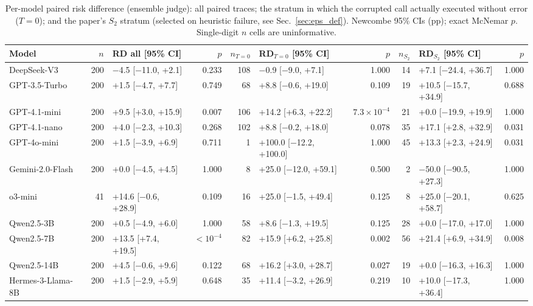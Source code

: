 \begin{table}[t]
\centering
\small
\caption{Per-model paired risk difference (ensemble judge): all paired traces; the stratum in which the corrupted call actually executed without error ($T{=}0$); and the paper's $S_2$ stratum (selected on heuristic failure, see Sec.~\ref{sec:eps_def}). Newcombe 95\% CIs (pp); exact McNemar $p$. Single-digit $n$ cells are uninformative.}
\label{tab:paired_rd_model}
\setlength{\tabcolsep}{3pt}
\begin{tabular}{l r l r r l r r l r}
\toprule
Model & $n$ & RD all [95\% CI] & $p$ & $n_{T=0}$ & RD$_{T=0}$ [95\% CI] & $p$ & $n_{S_2}$ & RD$_{S_2}$ [95\% CI] & $p$ \\
\midrule
DeepSeek-V3 & 200 & $-$4.5 [$-$11.0, +2.1] & 0.233 & 108 & $-$0.9 [$-$9.0, +7.1] & 1.000 & 14 & +7.1 [$-$24.4, +36.7] & 1.000 \\
GPT-3.5-Turbo & 200 & +1.5 [$-$4.7, +7.7] & 0.749 & 68 & +8.8 [$-$0.6, +19.0] & 0.109 & 19 & +10.5 [$-$15.7, +34.9] & 0.688 \\
GPT-4.1-mini & 200 & +9.5 [+3.0, +15.9] & 0.007 & 106 & +14.2 [+6.3, +22.2] & $7.3\times10^{-4}$ & 21 & +0.0 [$-$19.9, +19.9] & 1.000 \\
GPT-4.1-nano & 200 & +4.0 [$-$2.3, +10.3] & 0.268 & 102 & +8.8 [$-$0.2, +18.0] & 0.078 & 35 & +17.1 [+2.8, +32.9] & 0.031 \\
GPT-4o-mini & 200 & +1.5 [$-$3.9, +6.9] & 0.711 & 1 & +100.0 [$-$12.2, +100.0] & 1.000 & 45 & +13.3 [+2.3, +24.9] & 0.031 \\
Gemini-2.0-Flash & 200 & +0.0 [$-$4.5, +4.5] & 1.000 & 8 & +25.0 [$-$12.0, +59.1] & 0.500 & 2 & $-$50.0 [$-$90.5, +27.3] & 1.000 \\
o3-mini & 41 & +14.6 [$-$0.6, +28.9] & 0.109 & 16 & +25.0 [$-$1.5, +49.4] & 0.125 & 8 & +25.0 [$-$20.1, +58.7] & 0.625 \\
Qwen2.5-3B & 200 & +0.5 [$-$4.9, +6.0] & 1.000 & 58 & +8.6 [$-$1.3, +19.5] & 0.125 & 28 & +0.0 [$-$17.0, +17.0] & 1.000 \\
Qwen2.5-7B & 200 & +13.5 [+7.4, +19.5] & $<10^{-4}$ & 82 & +15.9 [+6.2, +25.8] & 0.002 & 56 & +21.4 [+6.9, +34.9] & 0.008 \\
Qwen2.5-14B & 200 & +4.5 [$-$0.6, +9.6] & 0.122 & 68 & +16.2 [+3.0, +28.7] & 0.027 & 19 & +0.0 [$-$16.3, +16.3] & 1.000 \\
Hermes-3-Llama-8B & 200 & +1.5 [$-$2.9, +5.9] & 0.648 & 35 & +11.4 [$-$3.2, +26.9] & 0.219 & 10 & +10.0 [$-$17.3, +36.4] & 1.000 \\
\bottomrule
\end{tabular}
\end{table}
